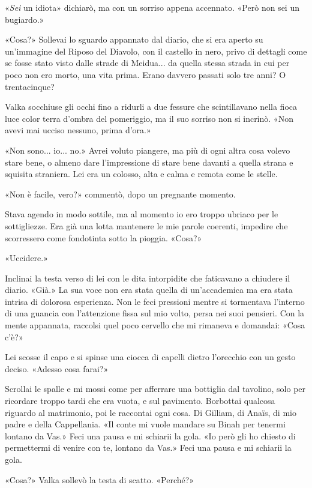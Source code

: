 «\emph{Sei} un idiota» dichiarò, ma con un sorriso appena accennato.
«Però non sei un bugiardo.»

«Cosa?» Sollevai lo sguardo appannato dal diario, che si era aperto su
un'immagine del Riposo del Diavolo, con il castello in nero, privo di
dettagli come se fosse stato visto dalle strade di Meidua... da quella
stessa strada in cui per poco non ero morto, una vita prima. Erano
davvero passati solo tre anni? O trentacinque?

Valka socchiuse gli occhi fino a ridurli a due fessure che scintillavano
nella fioca luce color terra d'ombra del pomeriggio, ma il suo sorriso
non si incrinò. «Non avevi mai ucciso nessuno, prima d'ora.»

«Non sono... io... no.» Avrei voluto piangere, ma più di ogni altra cosa
volevo stare bene, o almeno dare l'impressione di stare bene davanti a
quella strana e squisita straniera. Lei era un colosso, alta e calma e
remota come le stelle.

«Non è facile, vero?» commentò, dopo un pregnante momento.

Stava agendo in modo sottile, ma al momento io ero troppo ubriaco per le
sottigliezze. Era già una lotta mantenere le mie parole coerenti,
impedire che scorressero come fondotinta sotto la pioggia. «Cosa?»

«Uccidere.»

Inclinai la testa verso di lei con le dita intorpidite che faticavano a
chiudere il diario. «Già.» La sua voce non era stata quella di
un'accademica ma era stata intrisa di dolorosa esperienza. Non le feci
pressioni mentre si tormentava l'interno di una guancia con l'attenzione
fissa sul mio volto, persa nei suoi pensieri. Con la mente appannata,
raccolsi quel poco cervello che mi rimaneva e domandai: «Cosa c'è?»

Lei scosse il capo e si spinse una ciocca di capelli dietro l'orecchio
con un gesto deciso. «Adesso cosa farai?»

Scrollai le spalle e mi mossi come per afferrare una bottiglia dal
tavolino, solo per ricordare troppo tardi che era vuota, e sul
pavimento. Borbottai qualcosa riguardo al matrimonio, poi le raccontai
ogni cosa. Di Gilliam, di Anaïs, di mio padre e della Cappellania. «Il
conte mi vuole mandare su Binah per tenermi lontano da Vas.» Feci una
pausa e mi schiarii la gola. «Io però gli ho chiesto di permettermi di
venire con te, lontano da Vas.» Feci una pausa e mi schiarii la gola.

«Cosa?» Valka sollevò la testa di scatto. «Perché?»

